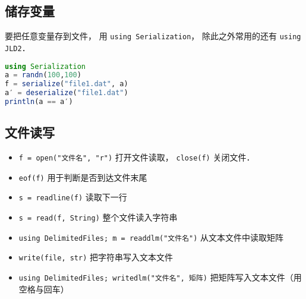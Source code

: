 \subsection{储存变量}
要把任意变量存到文件， 用 \verb|using Serialization|， 除此之外常用的还有 \verb|using JLD2|．
\begin{lstlisting}[language=julia]
using Serialization
a = randn(100,100)
f = serialize("file1.dat", a)
a′ = deserialize("file1.dat")
println(a == a′)
\end{lstlisting}

\subsection{文件读写}
\begin{itemize}
\item \verb|f = open("文件名", "r")| 打开文件读取， \verb|close(f)| 关闭文件．
\item \verb|eof(f)| 用于判断是否到达文件末尾
\item \verb|s = readline(f)| 读取下一行
\item \verb|s = read(f, String)| 整个文件读入字符串
\item \verb|using DelimitedFiles; m = readdlm("文件名")| 从文本文件中读取矩阵
\item \verb|write(file, str)| 把字符串写入文本文件
\item \verb|using DelimitedFiles; writedlm("文件名", 矩阵)| 把矩阵写入文本文件（用空格与回车）
\end{itemize}

